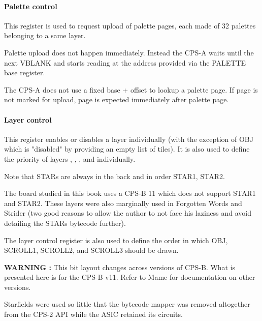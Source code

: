 \paragraph{Palette control}This register is used to request upload of palette pages, each made of 32 palettes belonging to a same layer.

 

Palette upload does not happen immediately. Instead the CPS-A waits until the next VBLANK and starts reading at the address provided via the PALETTE base register.

The CPS-A does not use a fixed base + offset to lookup a palette page. If  page is not marked for upload,  page is expected immediately after  palette page.



\paragraph{Layer control} This register enables or disables a layer individually (with the exception of OBJ which is "disabled" by providing an empty list of tiles). It is also used to define the priority of layers , , , and  individually.

Note that STARs are always in the back and in order STAR1, STAR2.
  
 

The board studied in this book uses a CPS-B 11 which does not support STAR1 and STAR2. These layers were also marginally used in Forgotten Words and Strider (two good reasons to allow the author to not face his laziness and avoid detailing the STARs bytecode further).



The layer control register is also used to define the order in which OBJ, SCROLL1, SCROLL2, and SCROLL3 should be drawn.

 

\textbf{WARNING :} This bit layout changes across versions of CPS-B. What is presented here is for the CPS-B v11. Refer to Mame for documentation on other versions.

\begin{trivia}
Starfields were used so little that the bytecode mapper was removed altogether from the CPS-2 API while the ASIC retained its circuits.
\end{trivia}



